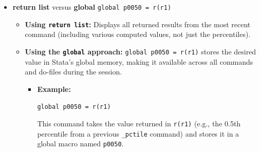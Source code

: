 \documentclass{article}
\begin{document}
\begin{itemize}[leftmargin=*,itemsep=8pt]
 \item \textcolor{statablue}{\textbf{return list}} versus \textcolor{statablue}{\textbf{global}}    
 \texttt{global p0050 = r(r1)}    
 \begin{itemize}[leftmargin=*, itemsep=4pt]  
   \item \textbf{Using \texttt{return list}:}    
     Displays all returned results from the most recent command (including various computed values, not just the percentiles).  
   \item \textbf{Using the \texttt{global} approach:}    
     \texttt{global p0050 = r(r1)} stores the desired value in Stata's global memory, making it available across all commands and do-files during the session.  
     \begin{itemize}[leftmargin=*, itemsep=3pt]  
       \item \textbf{Example:}    
       \begin{tcolorbox}[colback=lightgray!50, colframe=lightgray!20, boxrule=0.5pt]  
       \texttt{global p0050 = r(r1)}  
       \end{tcolorbox}  
       This command takes the value returned in \texttt{r(r1)} (e.g., the 0.5th percentile from a previous \texttt{\_pctile} command) and stores it in a global macro named \texttt{p0050}.  
     \end{itemize}  
 \end{itemize}  
\end{itemize}
\end{document}
